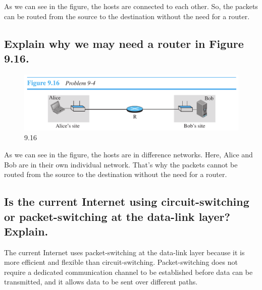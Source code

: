 \documentclass{article}
\begin{document}
As we can see in the figure, the hosts are connected to each other. So, the packets can be routed from the source to the destination without the need for a router.

\subsection{
	Explain why we may need a router in Figure 9.16.
}
\begin{figure}[H]
	\center
	\includegraphics[scale=0.5]{9.16.png}
	\caption{9.16}
\end{figure}

As we can see in the figure, the hosts are in difference networks. Here, Alice and Bob are in their own individual network.
That's why the packets cannot be routed from the source to the destination without the need for a router.

\subsection{
	Is the current Internet using circuit-switching or packet-switching at the data-link layer? Explain.
}

The current Internet uses packet-switching at the data-link layer because it is more efficient and flexible than circuit-switching. Packet-switching does not require a dedicated communication channel to be established before data can be transmitted, and it allows data to be sent over different paths.
\end{document}
